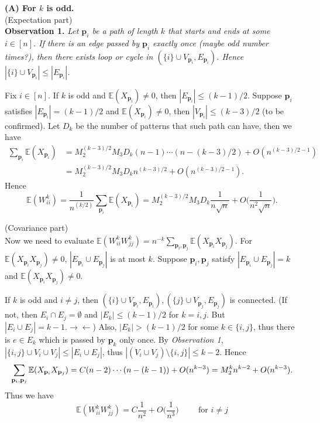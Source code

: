 \begin{answer}
\textbf{(A) For $k$ is odd.}\\
(Expectation part)\\
\textbf{Observation 1.} \textit{Let $\mathbf{p}_i$ be a path of length $k$ that starts and ends at some $i\in[n]$. If there is an edge passed by $\mathbf{p}_i$ exactly once (maybe odd number times?), then there exists loop or cycle in $(\{i\}\cup V_{\mathbf{p}_i}, E_{\mathbf{p}_i})$. Hence $|\{i\}\cup V_{\mathbf{p}_i}|\leq|E_{\mathbf{p}_i}|$.}

Fix $i\in[n]$. If $k$ is odd and $\mathbb{E}(X_{\mathbf{p}_i})\neq 0$, then $|E_{\mathbf{p}_i}|\leq (k-1)/2$. Suppose $\mathbf{p}_i$ satisfies $|E_{\mathbf{p}_i}|=(k-1)/2$ and $\mathbb{E}(X_{\mathbf{p}_i})\neq 0$, then $|V_{\mathbf{p}_i}|\leq(k-3)/2$ (to be confirmed). Let $D_{k}$ be the number of patterns that such path can have, then we have
\begin{equation*}
\begin{aligned}
    \sum_{\mathbf{p}_i}\mathbb{E}(X_{\mathbf{p}_i})&=M_2^{(k-3)/2}M_3D_k(n-1)\cdots(n-(k-3)/2)+O(n^{(k-3)/2-1})\\&
    =M_2^{(k-3)/2}M_3D_kn^{(k-3)/2}+O(n^{(k-3)/2-1}).
\end{aligned}
\end{equation*}
Hence
\begin{equation*}
    \mathbb{E}(W_{ii}^k)=\frac{1}{n^{(k/2)}}\sum_{\mathbf{p}_i}\mathbb{E}(X_{\mathbf{p}_i})=M_2^{(k-3)/2}M_3D_k\frac{1}{n\sqrt{n}}+O\Big(\frac{1}{n^2\sqrt{n}}\Big).
\end{equation*}

(Covariance part)\\
Now we need to evaluate $\mathbb{E}(W_{ii}^kW_{jj}^k)=n^{-k}\sum_{\mathbf{p}_i,\mathbf{p}_j}\mathbb{E}(X_{\mathbf{p}_i}X_{\mathbf{p}_j})$. For $\mathbb{E}(X_{\mathbf{p}_i}X_{\mathbf{p}_j})\neq 0$, $|E_{\mathbf{p}_i}\cup E_{\mathbf{p}_j}|$ is at most $k$. Suppose $\mathbf{p}_i,\mathbf{p}_j$ satisfy $|E_{\mathbf{p}_i}\cup E_{\mathbf{p}_j}|=k$ and $\mathbb{E}(X_{\mathbf{p}_i}X_{\mathbf{p}_j})\neq 0$.

If $k$ is odd and $i\neq j$, then $(\{i\}\cup V_{\mathbf{p}_i},E_{\mathbf{p}_i}),(\{j\}\cup V_{\mathbf{p}_j},E_{\mathbf{p}_j})$ is connected. (If not, then $E_i\cap E_j=\emptyset$ and $|E_k|\leq(k-1)/2$ for $k=i,j$. But $|E_i\cup E_j|=k-1.\rightarrow\leftarrow$) Also, $|E_k|>(k-1)/2$ for some $k\in\{i,j\}$, thus there is $e\in E_k$ which is passed by $\mathbf{p}_k$ only once. By \textit{Observation 1}, $|\{i,j\}\cup V_i\cup V_j|\leq|E_i\cup E_j|$, thus $|(V_i\cup V_j)\setminus\{i,j\}|\leq k-2$. Hence
\begin{equation*}
    \sum_{\mathbf{p}_i\\,\mathbf{p}_j}\mathbb{E}(X_{\mathbf{p}_i}X_{\mathbf{p}_j})=C(n-2)\cdots(n-(k-1))+O(n^{k-3})=M_2^kn^{k-2}+O(n^{k-3}).
\end{equation*}
Thus we have
\begin{equation*}
    \mathbb{E}(W_{ii}^kW_{jj}^k)=C\frac{1}{n^2}+O\Big(\frac{1}{n^3}\Big)\hspace{1cm}\text{for }i\neq j
\end{equation*}


\end{answer}
